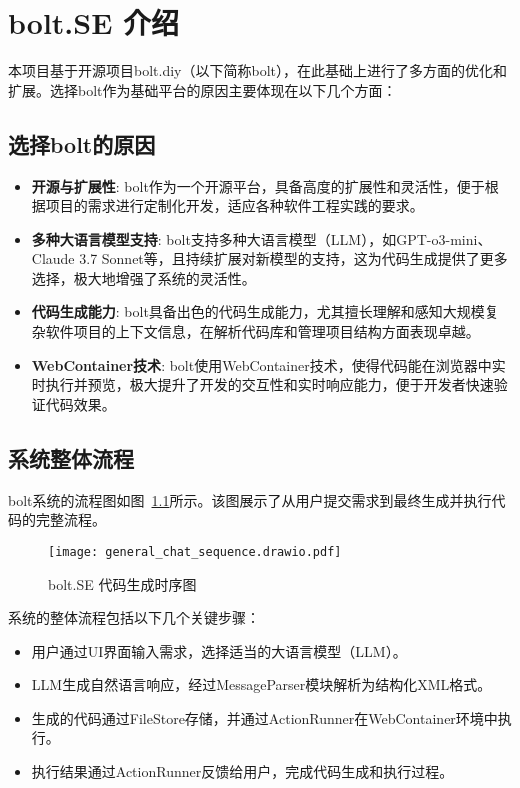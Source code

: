 \chapter{bolt.SE 介绍}

本项目基于开源项目bolt.diy（以下简称bolt），在此基础上进行了多方面的优化和扩展。选择bolt作为基础平台的原因主要体现在以下几个方面：

\section{选择bolt的原因}

\begin{itemize}
    \item \textbf{开源与扩展性}: bolt作为一个开源平台，具备高度的扩展性和灵活性，便于根据项目的需求进行定制化开发，适应各种软件工程实践的要求。
    \item \textbf{多种大语言模型支持}: bolt支持多种大语言模型（LLM），如GPT-o3-mini、Claude 3.7 Sonnet等，且持续扩展对新模型的支持，这为代码生成提供了更多选择，极大地增强了系统的灵活性。
    \item \textbf{代码生成能力}: bolt具备出色的代码生成能力，尤其擅长理解和感知大规模复杂软件项目的上下文信息，在解析代码库和管理项目结构方面表现卓越。
    \item \textbf{WebContainer技术}: bolt使用WebContainer技术，使得代码能在浏览器中实时执行并预览，极大提升了开发的交互性和实时响应能力，便于开发者快速验证代码效果。
\end{itemize}

\section{系统整体流程}

bolt系统的流程图如图~\ref{fig:general_chat_sequence}所示。该图展示了从用户提交需求到最终生成并执行代码的完整流程。

\begin{figure}[ht]
  \centering
  \texttt{[image: general\_chat\_sequence.drawio.pdf]}
  \caption{bolt.SE 代码生成时序图}
  \label{fig:general_chat_sequence}
\end{figure}

系统的整体流程包括以下几个关键步骤：
\begin{itemize}
    \item 用户通过UI界面输入需求，选择适当的大语言模型（LLM）。
    \item LLM生成自然语言响应，经过MessageParser模块解析为结构化XML格式。
    \item 生成的代码通过FileStore存储，并通过ActionRunner在WebContainer环境中执行。
    \item 执行结果通过ActionRunner反馈给用户，完成代码生成和执行过程。
\end{itemize}

